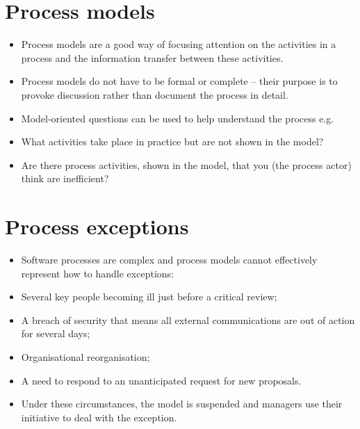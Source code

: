 \section{Process models}
\begin{itemize}
\item Process models are a good way of focusing attention on the activities in a process and the information transfer between these activities.

\item Process models do not have to be formal or complete – their purpose is to provoke discussion rather than document the process in detail.

\item Model-oriented questions can be used to help understand the process e.g.

   \item What activities take place in practice but are not shown in the model?
   \item Are there process activities, shown in the model, that you (the process actor) think are inefficient?

\end{itemize}

\section{Process exceptions}
\begin{itemize}


\item Software processes are complex and process models cannot effectively represent how to handle exceptions:

   \item Several key people becoming ill just before a critical review;
   \item A breach of security that means all external communications are out of action for several days;
   \item Organisational reorganisation;
   \item A need to respond to an unanticipated request for new proposals.

\item Under these circumstances, the model is suspended and managers use their initiative to deal with the exception.
\end{itemize}

